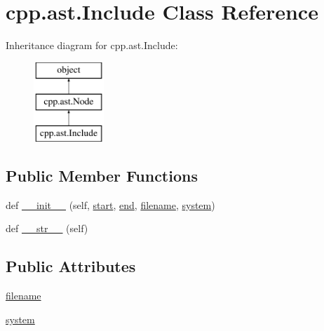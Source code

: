 \hypertarget{classcpp_1_1ast_1_1Include}{}\section{cpp.\+ast.\+Include Class Reference}
\label{classcpp_1_1ast_1_1Include}
Inheritance diagram for cpp.\+ast.\+Include\+:\begin{figure}[H]
\begin{center}
\leavevmode
\includegraphics[height=3.000000cm]{classcpp_1_1ast_1_1Include}
\end{center}
\end{figure}
\subsection*{Public Member Functions}
\begin{DoxyCompactItemize}
\item 
def \mbox{\hyperlink{classcpp_1_1ast_1_1Include_a41b000a9f16a9a1840e56a761bb7045c}{\+\_\+\+\_\+init\+\_\+\+\_\+}} (self, \mbox{\hyperlink{classcpp_1_1ast_1_1Node_a7b2aa97e6a049bb1a93aea48c48f1f44}{start}}, \mbox{\hyperlink{classcpp_1_1ast_1_1Node_a3c5e5246ccf619df28eca02e29d69647}{end}}, \mbox{\hyperlink{classcpp_1_1ast_1_1Include_a9ecff64f127655d3c17e9abe4ebe3852}{filename}}, \mbox{\hyperlink{classcpp_1_1ast_1_1Include_a2e8e535b1af7d9b0ff94d0ae9f86e5c5}{system}})
\item 
def \mbox{\hyperlink{classcpp_1_1ast_1_1Include_ad7d9e5e8f46dcb1a91a282e609412a3e}{\+\_\+\+\_\+str\+\_\+\+\_\+}} (self)
\end{DoxyCompactItemize}
\subsection*{Public Attributes}
\begin{DoxyCompactItemize}
\item 
\mbox{\hyperlink{classcpp_1_1ast_1_1Include_a9ecff64f127655d3c17e9abe4ebe3852}{filename}}
\item 
\mbox{\hyperlink{classcpp_1_1ast_1_1Include_a2e8e535b1af7d9b0ff94d0ae9f86e5c5}{system}}
\end{DoxyCompactItemize}


